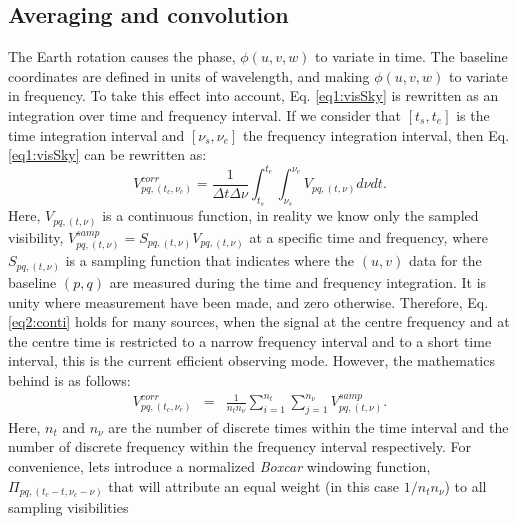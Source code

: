 \documentclass[useAMS,usenatbib]{mn2e}
\begin{document}
\subsection{Averaging and convolution}
\label{sec:AvgCon}
The Earth rotation causes the phase, $\phi (u,v,w)$ to variate in time. The baseline 
coordinates are defined in units of wavelength, and making $\phi (u,v,w)$ to variate in frequency. 
To take this effect into account, Eq. \ref{eq1:visSky} is  rewritten as an integration over time and frequency interval. If we 
consider that $[t_s,t_e]$ is the time integration interval and $[\nu_s,\nu_e]$ the frequency integration 
interval, then Eq.\ref{eq1:visSky} can be rewritten as:
\begin{equation}
V_{pq,(t_c,\nu_c)}^{corr}=\frac{1}{\Delta t \Delta \nu} \int_{t_s}^{t_e}\int_{\nu_s}^{\nu_e}V_{pq,(t,\nu)}d\nu dt.
\label{eq2:conti}
\end{equation}
Here, $V_{pq,(t,\nu)}$ is a continuous function, in reality we know only the sampled visibility, 
$V_{pq,(t,\nu)}^{samp}=S_{pq,(t,\nu)}V_{pq,(t,\nu)}$ at a specific time and frequency, where $S_{pq,(t,\nu)}$ is a sampling 
function that indicates where the $(u, v)$ data for the baseline $(p,q)$ are measured  during the time and frequency integration. It is 
unity where measurement have been made, and zero otherwise.
Therefore, 
Eq.\ref{eq2:conti} holds for many sources, when the signal at the centre frequency and at the centre time is restricted to a narrow 
frequency interval and to a short time interval, this is the current efficient observing mode. However, the mathematics behind is as 
follows: 
\begin{eqnarray}
V_{pq,(t_c,\nu_c)}^{corr}&=&\frac{1}{n_t n_{\nu}}  \sum_{i=1}^{n_t}\sum_{j=1}^{n_{\nu}}V_{pq,(t,\nu)}^{samp}.\label{eq2:sample}
\end{eqnarray}
Here, $n_t$ and $n_{\nu}$ are the number of discrete times within the time interval  and the number of discrete frequency 
within the frequency interval  respectively. For convenience, lets introduce a normalized \textit{Boxcar} windowing 
function, $\Pi_{pq,(t_c - t,\nu_c -\nu)}$  that will attribute an equal weight (in this case $1/n_t n_{\nu}$) to all sampling visibilities 
\end{document}
